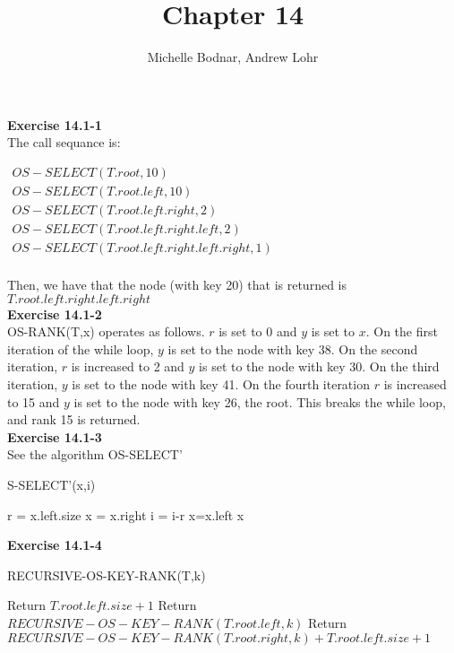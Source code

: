 \documentclass{article}
\title{Chapter 14}
\author{Michelle Bodnar, Andrew Lohr}
\begin{document}
\maketitle

\noindent\textbf{ Exercise 14.1-1} \\

The call sequance is:

$
\begin{array}{l}
OS-SELECT(T.root,10)\\
OS-SELECT(T.root.left,10)\\
OS-SELECT(T.root.left.right,2)\\
OS-SELECT(T.root.left.right.left,2)\\
OS-SELECT(T.root.left.right.left.right,1)\\
\end{array}
$

Then, we have that the node (with key 20) that is returned is $T.root.left.right.left.right$ \\

\noindent\textbf{Exercise 14.1-2}\\

OS-RANK(T,x) operates as follows.  $r$ is set to 0 and $y$ is set to $x$.  On the first iteration of the while loop, $y$ is set to the node with key 38.  On the second iteration, $r$ is increased to 2 and $y$ is set to the node with key 30.  On the third iteration, $y$ is set to the node with key 41.  On the fourth iteration $r$ is increased to 15 and $y$ is set to the node with key 26, the root.  This breaks the while loop, and rank 15 is returned. \\


\noindent\textbf{ Exercise 14.1-3} \\

See the algorithm OS-SELECT'
\begin{algorithm}
\caption OS-SELECT'(x,i)
\begin{algorithmic}
\State r = x.left.size
\State x = x.right
\State i = i-r
\Else
\State x=x.left
\EndIf
{}
\EndWhile
\State \Return x
\end{algorithmic}
\end{algorithm}

\noindent\textbf{Exercise 14.1-4}\\

\begin{algorithm}
\caption{RECURSIVE-OS-KEY-RANK(T,k)}
\begin{algorithmic}[1]
	\State Return $T.root.left.size + 1$
	\State Return $RECURSIVE-OS-KEY-RANK(T.root.left, k)$
\Else
	\State Return $RECURSIVE-OS-KEY-RANK(T.root.right, k) + T.root.left.size + 1$
\EndIf
\end{algorithmic}
\end{algorithm}
\end{document}
